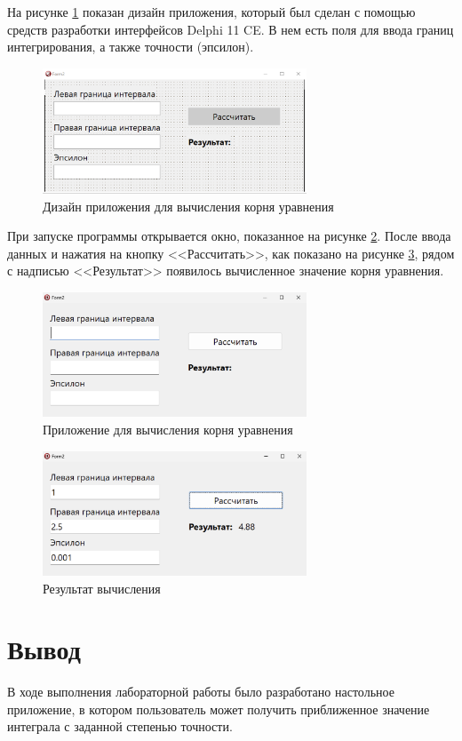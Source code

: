 \documentclass[a4paper, 14pt]{extarticle}
\begin{document}
На рисунке \ref{fig:design} показан дизайн приложения, который был
сделан с помощью средств разработки интерфейсов Delphi 11 CE. В нем есть
поля для ввода границ интегрирования, а также точности (эпсилон).

\begin{figure}[H]
  \centering
  \includegraphics[width=0.7\textwidth]{images/design.png}
  \caption{Дизайн приложения для вычисления корня уравнения}
  \label{fig:design}
\end{figure}

При запуске программы открывается окно, показанное на рисунке
\ref{fig:empty-form}. После ввода данных и нажатия на кнопку <<Рассчитать>>,
как показано на рисунке \ref{fig:filled-form}, рядом с надписью
<<Результат>> появилось вычисленное значение корня уравнения.

\begin{figure}[H]
  \centering
  \includegraphics[width=0.7\textwidth]{images/empty-form.png}
  \caption{Приложение для вычисления корня уравнения}
  \label{fig:empty-form}
\end{figure}

\begin{figure}[H]
  \centering
  \includegraphics[width=0.7\textwidth]{images/filled-form.png}
  \caption{Результат вычисления}
  \label{fig:filled-form}
\end{figure}

\section{Вывод}

В ходе выполнения лабораторной работы было разработано настольное приложение, в
котором пользователь может получить приближенное значение интеграла с заданной
степенью точности.
\end{document}
